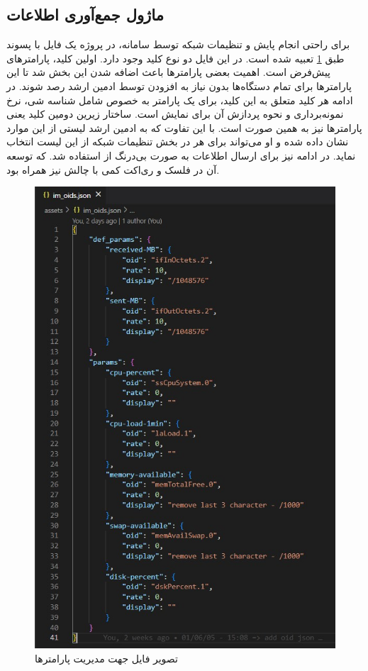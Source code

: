 \subsection{ماژول جمع‌آوری اطلاعات }

برای راحتی انجام پایش و تنظیمات شبکه توسط سامانه، در پروژه یک فایل با پسوند  طبق \cref{fig.122} تعبیه شده است. در این فایل دو نوع کلید وجود دارد. اولین کلید، پارامترهای پیش‌فرض است. اهمیت بعضی پارامترها باعث اضافه شدن این بخش شد تا این پارامترها برای تمام دستگاه‌ها بدون نیاز به افزودن توسط ادمین ارشد رصد شوند. در ادامه هر کلید متعلق به این کلید، برای یک پارامتر به خصوص شامل شناسه شی، نرخ نمونه‌برداری و نحوه پردازش آن برای نمایش است. ساختار زیرین دومین کلید یعنی پارامترها نیز به همین صورت است. با این تفاوت که به ادمین ارشد لیستی از این موارد نشان داده شده و او می‌تواند برای هر  در بخش تنظیمات شبکه از این لیست انتخاب نماید. در ادامه نیز برای ارسال اطلاعات به صورت بی‌درنگ از  استفاده شد. که توسعه آن در فلسک و ری‌اکت کمی با چالش نیز همراه بود.


\begin{figure}[!h]
    \centering\includegraphics[scale=.80]{./im-json}
    \caption{تصویر فایل  جهت مدیریت پارامترها}\label{fig.122}
\end{figure}




